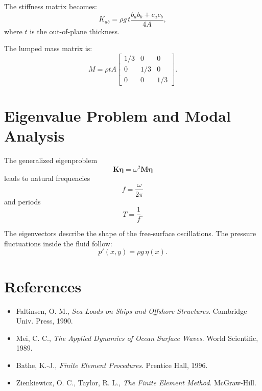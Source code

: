 \documentclass{article}
\begin{document}
The stiffness matrix becomes:
\begin{equation}
    K_{ab} = \rho g \, t \frac{b_a b_b + c_a c_b}{4 A},
\end{equation}
where $t$ is the out-of-plane thickness.

The lumped mass matrix is:
\begin{equation}
    M = \rho t A \begin{bmatrix}
        1/3 & 0 & 0 \\
        0 & 1/3 & 0 \\
        0 & 0 & 1/3
    \end{bmatrix}.
\end{equation}

\section{Eigenvalue Problem and Modal Analysis}
The generalized eigenproblem
\begin{equation}
    \bm{K} \bm{\eta} = \omega^2 \bm{M} \bm{\eta}
\end{equation}
leads to natural frequencies
\begin{equation}
    f = \frac{\omega}{2 \pi}
\end{equation}
and periods
\begin{equation}
    T = \frac{1}{f}.
\end{equation}

The eigenvectors describe the shape of the free-surface oscillations. The pressure fluctuations inside the fluid follow:
\begin{equation}
    p'(x,y) = \rho g \, \eta(x).
\end{equation}

\section{References}
\begin{itemize}
    \item Faltinsen, O. M., \textit{Sea Loads on Ships and Offshore Structures}. Cambridge Univ. Press, 1990.
    \item Mei, C. C., \textit{The Applied Dynamics of Ocean Surface Waves}. World Scientific, 1989.
    \item Bathe, K.-J., \textit{Finite Element Procedures}. Prentice Hall, 1996.
    \item Zienkiewicz, O. C., Taylor, R. L., \textit{The Finite Element Method}. McGraw-Hill.
\end{itemize}
\end{document}
